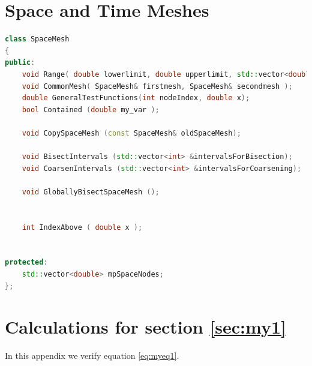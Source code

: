 \documentclass{uonmathreport}
\theoremstyle{definition}
\theoremstyle{problem}
\theoremstyle{theorem}
\begin{document}
\section{Space and Time Meshes} \label{app:smesh/tmesh}

\begin{lstlisting}[language=C++]
class SpaceMesh
{
public:
    void Range( double lowerlimit, double upperlimit, std::vector<double>& Nodes);
    void CommonMesh( SpaceMesh& firstmesh, SpaceMesh& secondmesh );
    double GeneralTestFunctions(int nodeIndex, double x);
    bool Contained (double my_var );

    void CopySpaceMesh (const SpaceMesh& oldSpaceMesh);

    void BisectIntervals (std::vector<int> &intervalsForBisection);
    void CoarsenIntervals (std::vector<int> &intervalsForCoarsening);

    void GloballyBisectSpaceMesh ();


    int IndexAbove ( double x );


protected:
    std::vector<double> mpSpaceNodes;
};


\end{lstlisting}


\section{Calculations for section \ref{sec:my1}} \label{app:calculations}

In this appendix we verify equation \eqref{eq:myeq1}.

\newpage

	
	
\end{document}
